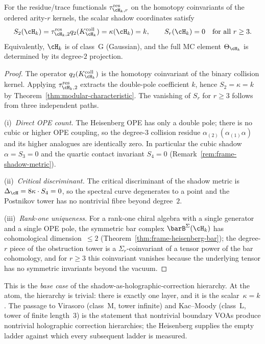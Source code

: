 \begin{proposition}
\label{prop:frame-thesis-shadow-termination}
For the residue/trace functionals
$\tau_{\cH_k,r}^{\mathrm{res}}$ on the homotopy coinvariants of the
ordered arity-$r$ kernels, the scalar shadow coordinates satisfy
\begin{equation}\label{eq:frame-thesis-shadow-termination}
 S_2(\cH_k)
 =\tau_{\cH_k,2}^{\mathrm{res}}
 q_2(K_{\cH_k}^{\mathrm{coll}})
 =\kappa(\cH_k)=k,
 \qquad
 S_r(\cH_k) = 0 \quad\text{for all } r \geq 3.
\end{equation}
Equivalently, $\cH_k$ is of class~G (Gaussian), and the full MC
element $\Theta_{\cH_k}$ is determined by its degree-$2$ projection.
\end{proposition}

\begin{proof}
The operator $q_2(K_{\cH_k}^{\mathrm{coll}})$ is the homotopy
coinvariant of the binary collision kernel. Applying
$\tau_{\cH_k,2}^{\mathrm{res}}$ extracts the double-pole coefficient
$k$, hence $S_2=\kappa=k$ by
Theorem~\ref{thm:modular-characteristic}. The
vanishing of $S_r$ for $r \geq 3$ follows from three independent
paths.

(i)~\emph{Direct OPE count.} The Heisenberg OPE has only a double
pole; there is no cubic or higher OPE coupling, so the degree-$3$
collision residue $\alpha_{(2)}(\alpha_{(1)}\alpha)$ and its
higher analogues are identically zero. In particular the cubic
shadow $\alpha = S_3 = 0$ and the quartic contact invariant
$S_4 = 0$ (Remark~\ref{rem:frame-shadow-metric}).

(ii)~\emph{Critical discriminant.} The critical discriminant of
the shadow metric is $\Delta_{\cH} = 8\kappa\cdot S_4 = 0$, so the
spectral curve degenerates to a point and the Postnikov tower has
no nontrivial fibre beyond degree~$2$.

(iii)~\emph{Rank-one uniqueness.} For a rank-one chiral algebra
with a single generator and a single OPE pole, the symmetric bar
complex $\barB^{\Sigma}(\cH_k)$ has cohomological dimension~$\leq 2$
(Theorem~\ref{thm:frame-heisenberg-bar}); the degree-$r$ piece of
the obstruction tower is a $\Sigma_r$-coinvariant of a tensor
power of the bar cohomology, and for $r \geq 3$ this coinvariant
vanishes because the underlying tensor has no symmetric invariants
beyond the vacuum.
\end{proof}

This is the \emph{base case} of the shadow-as-holographic-correction
hierarchy. At the atom, the hierarchy is trivial: there is exactly
one layer, and it is the scalar~$\kappa = k$. The passage to
Virasoro (class~M, tower infinite) and Kac--Moody (class~L, tower
of finite length~$3$) is the statement that nontrivial boundary
VOAs produce nontrivial holographic correction hierarchies; the
Heisenberg supplies the empty ladder against which every subsequent
ladder is measured.

